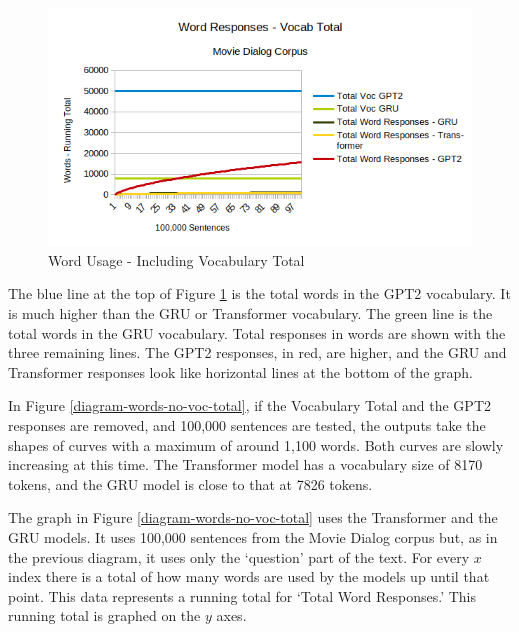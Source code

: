 \begin{figure}[H]
	\begin{center}
		\includegraphics[scale=0.75]{diagram-100000-vocab}
		
		
	\end{center}
	\caption[Word Usage]{Word Usage - Including Vocabulary Total}
	\label{diagram-words-with-voc-total}
	
\end{figure}

The blue line at the top of Figure \ref{diagram-words-with-voc-total} is the total words in the GPT2 vocabulary. It is much higher than the GRU or Transformer vocabulary.
The green line is the total words in the GRU vocabulary. Total responses in words are shown with the three remaining lines. The GPT2 responses, in red, are higher, and the GRU and Transformer responses look like horizontal lines at the bottom of the graph.

In Figure \ref{diagram-words-no-voc-total}, if the Vocabulary Total and the GPT2 responses are removed, and 100,000 sentences are tested, the outputs take the shapes of curves with a maximum of around 1,100 words. Both curves are slowly increasing at this time. The Transformer model has a vocabulary size of 8170 tokens, and the GRU model is close to that at 7826 tokens.

The graph in Figure \ref{diagram-words-no-voc-total} uses the Transformer and the GRU models. It uses 100,000 sentences from the Movie Dialog corpus but, as in the previous diagram, it uses only the `question' part of the text. For every $x$ index there is a total of how many words are used by the models up until that point. This data represents a running total for `Total Word Responses.' This running total is graphed on the $y$ axes. 

